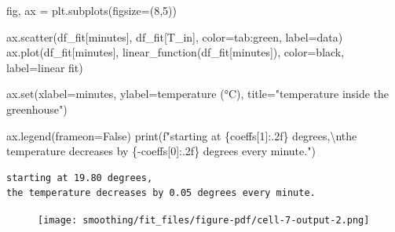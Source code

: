 \documentclass[
  letterpaper,
  DIV=11,
  numbers=noendperiod,
  oneside]{scrreprt}
\newenvironment{Shaded}{\begin{snugshade}}{\end{snugshade}}
\newcommand{\BuiltInTok}[1]{\textcolor[rgb]{0.00,0.23,0.31}{#1}}
\newcommand{\CharTok}[1]{\textcolor[rgb]{0.13,0.47,0.30}{#1}}
\newcommand{\DecValTok}[1]{\textcolor[rgb]{0.68,0.00,0.00}{#1}}
\newcommand{\NormalTok}[1]{\textcolor[rgb]{0.00,0.23,0.31}{#1}}
\newcommand{\OperatorTok}[1]{\textcolor[rgb]{0.37,0.37,0.37}{#1}}
\newcommand{\SpecialCharTok}[1]{\textcolor[rgb]{0.37,0.37,0.37}{#1}}
\newcommand{\SpecialStringTok}[1]{\textcolor[rgb]{0.13,0.47,0.30}{#1}}
\newcommand{\StringTok}[1]{\textcolor[rgb]{0.13,0.47,0.30}{#1}}
\newcommand{\VariableTok}[1]{\textcolor[rgb]{0.07,0.07,0.07}{#1}}
\begin{document}
\begin{Shaded}
\begin{Highlighting}[]
\NormalTok{fig, ax }\OperatorTok{=}\NormalTok{ plt.subplots(figsize}\OperatorTok{=}\NormalTok{(}\DecValTok{8}\NormalTok{,}\DecValTok{5}\NormalTok{))}

\NormalTok{ax.scatter(df\_fit[}\StringTok{\textquotesingle{}minutes\textquotesingle{}}\NormalTok{], df\_fit[}\StringTok{\textquotesingle{}T\_in\textquotesingle{}}\NormalTok{],}
\NormalTok{           color}\OperatorTok{=}\StringTok{\textquotesingle{}tab:green\textquotesingle{}}\NormalTok{, label}\OperatorTok{=}\StringTok{\textquotesingle{}data\textquotesingle{}}\NormalTok{)}
\NormalTok{ax.plot(df\_fit[}\StringTok{\textquotesingle{}minutes\textquotesingle{}}\NormalTok{], linear\_function(df\_fit[}\StringTok{\textquotesingle{}minutes\textquotesingle{}}\NormalTok{]),}
\NormalTok{        color}\OperatorTok{=}\StringTok{\textquotesingle{}black\textquotesingle{}}\NormalTok{, label}\OperatorTok{=}\StringTok{\textquotesingle{}linear fit\textquotesingle{}}\NormalTok{)}

\NormalTok{ax.}\BuiltInTok{set}\NormalTok{(xlabel}\OperatorTok{=}\StringTok{\textquotesingle{}minutes\textquotesingle{}}\NormalTok{,}
\NormalTok{       ylabel}\OperatorTok{=}\StringTok{\textquotesingle{}temperature (°C)\textquotesingle{}}\NormalTok{,}
\NormalTok{       title}\OperatorTok{=}\StringTok{"temperature inside the greenhouse"}\NormalTok{)}

\NormalTok{ax.legend(frameon}\OperatorTok{=}\VariableTok{False}\NormalTok{)}
\BuiltInTok{print}\NormalTok{(}\SpecialStringTok{f"starting at }\SpecialCharTok{\{}\NormalTok{coeffs[}\DecValTok{1}\NormalTok{]}\SpecialCharTok{:.2f\}}\SpecialStringTok{ degrees,}\CharTok{\textbackslash{}n}\SpecialStringTok{the temperature decreases by }\SpecialCharTok{\{}\OperatorTok{{-}}\NormalTok{coeffs[}\DecValTok{0}\NormalTok{]}\SpecialCharTok{:.2f\}}\SpecialStringTok{ degrees every minute."}\NormalTok{)}
\end{Highlighting}
\end{Shaded}

\begin{verbatim}
starting at 19.80 degrees,
the temperature decreases by 0.05 degrees every minute.
\end{verbatim}

\begin{figure}[H]

{\centering \texttt{[image: smoothing/fit\_files/figure-pdf/cell-7-output-2.png]}

}

\end{figure}
\end{document}
